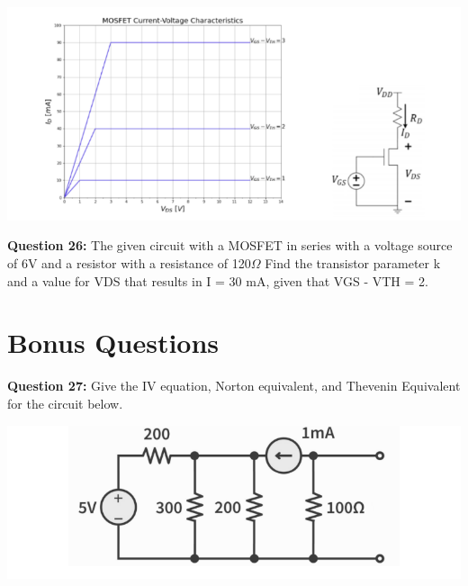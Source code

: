\documentclass{article}
\begin{document}
\begin{center}

        \includegraphics[width=1\linewidth]{figures/78.png}
\end{center}

\textbf{Question 26:} The given circuit with a MOSFET in series with a voltage source of 6V and a resistor with a resistance of 120\(\Omega\)
Find the transistor parameter k and a value for VDS that results in I = 30 mA, given that VGS - VTH = 2.

\section*{Bonus Questions}

\textbf{Question 27:} Give the IV equation, Norton equivalent, and Thevenin Equivalent for the circuit below.

\begin{center}

    \includegraphics[width=0.75\linewidth]{figures/99.png}
\end{center}
\end{document}
